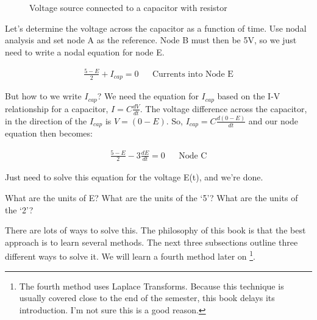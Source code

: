 \begin{figure}[H]
\begin{center}
\caption{Voltage source connected to a capacitor with resistor}
\label{F:6CB}
\end{center}
\end{figure}

Let's determine the voltage across the capacitor as a function of time. Use nodal analysis and set node A as the reference. Node B must then be 5V, so we just need to write a nodal equation for node E.

\begin{align}
\frac{5-E}{2}+I_{cap}=0 &&\text{Currents into Node E}
\end{align}

But how to we write $I_{cap}$? We need the equation for $I_{cap}$ based on the I-V relationship for a capacitor, $I=C\frac{dV}{dt}$. The voltage difference across the capacitor, in the direction of the $I_{cap}$ is $V = (0-E)$. So, $I_{cap}=C\frac{d(0-E)}{dt}$ and our node equation then becomes:

\begin{align}
\frac{5-E}{2}-3\frac{dE}{dt}=0 &&\text{Node C} \label{E:6RC}
\end{align}

Just need to solve this equation for the voltage E(t), and we're done.

\begin{alevel}
What are the units of E? What are the units of the `5'? What are the units of the `2'?
\end{alevel}

There are lots of ways to solve this. The philosophy of this book is that the best approach is to learn several methods. The next three subsections outline three different ways to solve it. We will learn a fourth method later on \footnote{The fourth method uses Laplace Transforms. Because this technique is usually covered close to the end of the semester, this book delays its introduction. I'm not sure this is a good reason.}.

